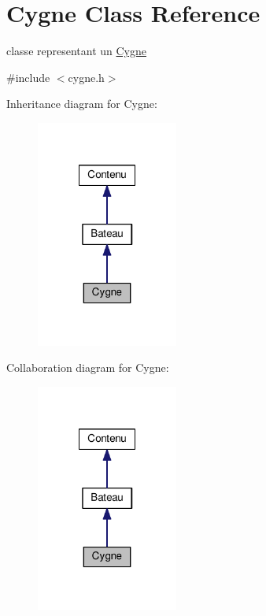 \hypertarget{classCygne}{\section{Cygne Class Reference}
\label{classCygne}
}


classe representant un \hyperlink{classCygne}{Cygne}  




{\ttfamily \#include $<$cygne.\+h$>$}



Inheritance diagram for Cygne\+:
\nopagebreak
\begin{figure}[H]
\begin{center}
\leavevmode
\includegraphics[width=132pt]{classCygne__inherit__graph}
\end{center}
\end{figure}


Collaboration diagram for Cygne\+:
\nopagebreak
\begin{figure}[H]
\begin{center}
\leavevmode
\includegraphics[width=132pt]{classCygne__coll__graph}
\end{center}
\end{figure}
